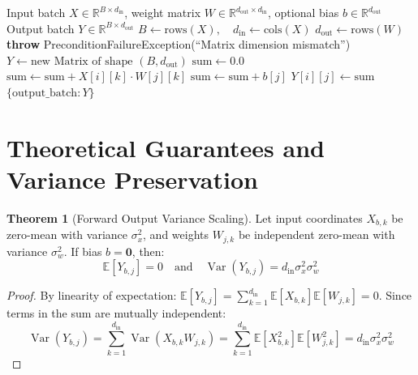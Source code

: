 \documentclass[11pt,a4paper]{article}
\theoremstyle{definition}
\newtheorem{theorem}{Theorem}[section]
\begin{document}
\begin{algorithm}[H]
\caption{Linear Affine Layer Forward Evaluation}
\begin{algorithmic}[1]
\Require Input batch $X \in \mathbb{R}^{B \times d_{\text{in}}}$, weight matrix $W \in \mathbb{R}^{d_{\text{out}} \times d_{\text{in}}}$, optional bias $b \in \mathbb{R}^{d_{\text{out}}}$
\Ensure Output batch $Y \in \mathbb{R}^{B \times d_{\text{out}}}$
\State $B \gets \text{rows}(X), \quad d_{\text{in}} \gets \text{cols}(X)$
\State $d_{\text{out}} \gets \text{rows}(W)$
    \State \textbf{throw} PreconditionFailureException(``Matrix dimension mismatch'')
\EndIf
\State $Y \gets \text{new Matrix of shape } (B, d_{\text{out}})$
        \State $\text{sum} \gets 0.0$
            \State $\text{sum} \gets \text{sum} + X[i][k] \cdot W[j][k]$
        \EndFor
            \State $\text{sum} \gets \text{sum} + b[j]$
        \EndIf
        \State $Y[i][j] \gets \text{sum}$
    \EndFor
\EndFor
\State \Return $\{\text{output\_batch}: Y\}$
\end{algorithmic}
\end{algorithm}

\section{Theoretical Guarantees and Variance Preservation}

\begin{theorem}[Forward Output Variance Scaling]
Let input coordinates $X_{b, k}$ be zero-mean with variance $\sigma_x^2$, and weights $W_{j, k}$ be independent zero-mean with variance $\sigma_w^2$. If bias $b = \mathbf{0}$, then:
\begin{equation}
\mathbb{E}[Y_{b, j}] = 0 \quad \text{and} \quad \operatorname{Var}(Y_{b, j}) = d_{\text{in}} \sigma_x^2 \sigma_w^2
\end{equation}
\end{theorem}

\begin{proof}
By linearity of expectation: $\mathbb{E}[Y_{b, j}] = \sum_{k=1}^{d_{\text{in}}} \mathbb{E}[X_{b, k}] \mathbb{E}[W_{j, k}] = 0$.
Since terms in the sum are mutually independent:
\begin{equation}
\operatorname{Var}(Y_{b, j}) = \sum_{k=1}^{d_{\text{in}}} \operatorname{Var}(X_{b, k} W_{j, k}) = \sum_{k=1}^{d_{\text{in}}} \mathbb{E}[X_{b, k}^2] \mathbb{E}[W_{j, k}^2] = d_{\text{in}} \sigma_x^2 \sigma_w^2
\end{equation}
\end{proof}
\end{document}
